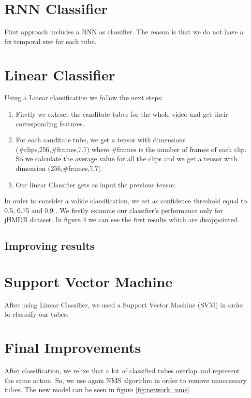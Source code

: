 \documentclass{report}
\begin{document}
\section{ RNN Classifier}
First approach includes a RNN as classifier. The reason is that we do not have a fix temporal size for
each tube. 

\section{Linear Classifier}

Using a Linear classification we follow the next steps:
\begin{enumerate}
\item Firstly we extract the canditate tubes for the whole video and get their corresponding features.
\item For each canditate tube, we get a tensor with dimensions (\#clips,256,\#frames,7,7) where \#frames is
  the number of frames of each clip. So we calculate the average value for all the clips and we get a tensor
  with dimension (256,\#frames,7,7).
\item Our linear Classifier gets as input the previous tensor.
\end{enumerate}

In order to consider a valide classification, we set as confidence threshold equal to 0.5, 0.75 and 0.9 .
We firstly examine our classifier's performance only for jHMDB dataset. 
In figure \ref{} we can see the first results which are disappointed. 

\subsection{Improving results}



\section{Support Vector Machine}
After using Linear Classifier, we used a Support Vector Machine (SVM) in order to classsify our tubes.




\section{Final Improvements}
After classification, we relize that a lot of classified tubes overlap and represent the same action. So, we use again NMS algorithm in order
to remove unnecessary tubes. The new model can be seen in figure \ref{fig:network_nms}.
\end{document}
